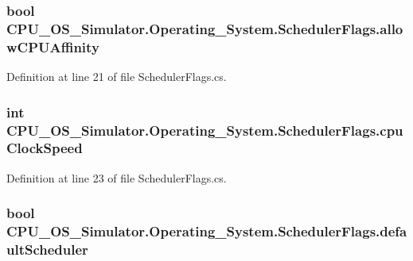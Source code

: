 \subsubsection[{allow\+C\+P\+U\+Affinity}]{\setlength{\rightskip}{0pt plus 5cm}bool C\+P\+U\+\_\+\+O\+S\+\_\+\+Simulator.\+Operating\+\_\+\+System.\+Scheduler\+Flags.\+allow\+C\+P\+U\+Affinity}\label{struct_c_p_u___o_s___simulator_1_1_operating___system_1_1_scheduler_flags_ad2d1f81a34e9cce1553bfdf8e8a719ea}


Definition at line 21 of file Scheduler\+Flags.\+cs.

\hypertarget{struct_c_p_u___o_s___simulator_1_1_operating___system_1_1_scheduler_flags_a3ce064f3abe5ac1762f0e7bbfab2eee5}{}
\subsubsection[{cpu\+Clock\+Speed}]{\setlength{\rightskip}{0pt plus 5cm}int C\+P\+U\+\_\+\+O\+S\+\_\+\+Simulator.\+Operating\+\_\+\+System.\+Scheduler\+Flags.\+cpu\+Clock\+Speed}\label{struct_c_p_u___o_s___simulator_1_1_operating___system_1_1_scheduler_flags_a3ce064f3abe5ac1762f0e7bbfab2eee5}


Definition at line 23 of file Scheduler\+Flags.\+cs.

\hypertarget{struct_c_p_u___o_s___simulator_1_1_operating___system_1_1_scheduler_flags_a3ccbd91b280afcd060460a7668d75d0f}{}
\subsubsection[{default\+Scheduler}]{\setlength{\rightskip}{0pt plus 5cm}bool C\+P\+U\+\_\+\+O\+S\+\_\+\+Simulator.\+Operating\+\_\+\+System.\+Scheduler\+Flags.\+default\+Scheduler}\label{struct_c_p_u___o_s___simulator_1_1_operating___system_1_1_scheduler_flags_a3ccbd91b280afcd060460a7668d75d0f}


